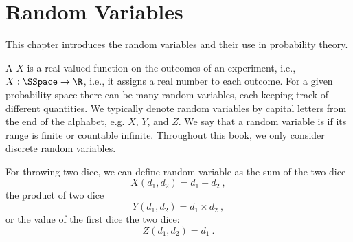 \chapter{Random Variables}
\label{ch:probability::randvar}

\begin{cluster}
\label{grp:prmbl:probability::randvar::introduces}

\begin{preamble}
\label{prmbl:probability::randvar::introduces}
This chapter introduces the random variables and their use in probability theory.

\end{preamble}
\end{cluster}

\begin{flex}
\label{grp:def:probability::rv}

\begin{definition}
\label{def:probability::rv}
A  $X$ is a real-valued function on the outcomes
of an experiment, i.e., $X : \SSpace \to \R$, i.e., it assigns a real
number to each outcome.
For a given probability space there can be many random variables, each keeping
track of different quantities.
We typically denote random variables by capital letters from
the end of the alphabet, e.g. $X$, $Y$, and $Z$.
We say that a random variable is  if its range is
finite or countable infinite.  Throughout this book, we only consider
discrete random variables. 

\end{definition}

\begin{example}
\label{xmpl:probability::randvar::throwing}
For throwing two dice, we can define random variable as the sum of
the two dice
\[
X(d_1,d_2) = d_1+d_2~,
\]
the product of two dice
\[
Y(d_1,d_2) = d_1 \times d_2~,
\]
or the value of the first dice
the two dice:
\[
Z(d_1,d_2) = d_1~.
\]

\end{example}
\end{flex}

